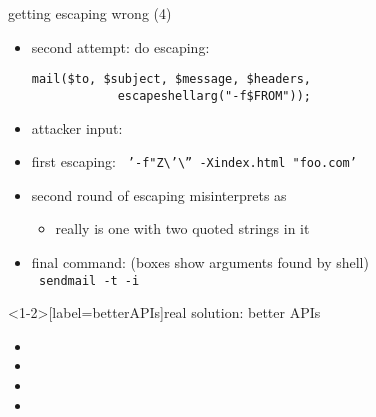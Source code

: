 \begin{frame}[fragile,label=wrongEscaping4]{getting escaping wrong (4)}
    \begin{itemize}
    \item second attempt: do escaping:
\begin{verbatim}
mail($to, $subject, $message, $headers,
            escapeshellarg("-f$FROM"));
\end{verbatim}
    \item attacker input: 
    \item first escaping: \texttt{
            '{\color{blue!70!black}-f"Z\textbackslash}'\textbackslash''{\color{green!70!black}~-Xindex.html "foo.com}'
        }
    \item second round of escaping misinterprets as 
        \begin{itemize}
        \item really is one with two quoted strings in it
        \end{itemize}
    \item final command: (boxes show arguments found by shell) \\
        {\fontsize{11}{11}\selectfont\texttt{
            sendmail -t -i   
        }}
    \end{itemize}
\end{frame}


\begin{frame}<1-2>[label=betterAPIs]{real solution: better APIs}
    \begin{itemize}
    \item {}
    \item {}
    \vspace{.5cm}
\item {}
\item {}
    \end{itemize}
\end{frame}

